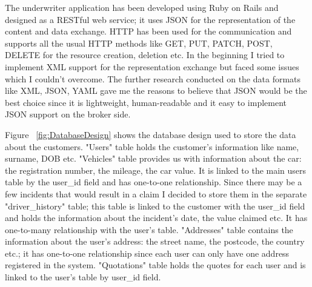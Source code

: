 \documentclass[10pt,a4paper,headinclude=true,twoside]{report}
\begin{document}
The underwriter application has been developed using Ruby on Rails and designed as a RESTful web service; it uses JSON for the representation of the content and data exchange. HTTP has been used for the communication and supports all the usual HTTP methods like GET, PUT, PATCH, POST, DELETE for the resource creation, deletion etc. In the beginning I tried to implement XML support for the representation exchange but faced some issues which I couldn't overcome. The further research conducted on the data formats like XML, JSON, YAML gave me the reasons to believe that JSON would be the best choice since it is lightweight, human-readable and it easy to implement JSON support on the broker side.

Figure ~\ref{fig:DatabaseDesign} shows the database design used to store the data about the customers. "Users" table holds the customer's information like name, surname, DOB etc. "Vehicles" table provides us with information about the car: the registration number, the mileage, the car value. It is linked to the main users table by the user\_id field and has one-to-one relationship. Since there may be a few incidents that would result in a claim I decided to store them in the separate "driver\_history" table; this table is linked to the customer with the user\_id field and holds the information about the incident's date,  the value claimed etc. It has one-to-many relationship with the user's table. "Addresses" table contains the information about the user's address: the street name, the postcode, the country etc.; it has one-to-one relationship since each user can only have one address registered in the system. "Quotations" table holds the quotes for each user and is linked to the user's table by user\_id field.   
\end{document}
